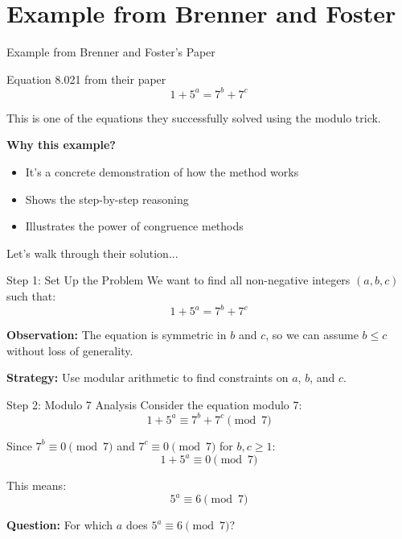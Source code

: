 \section{Example from Brenner and Foster}

\begin{frame}{Example from Brenner and Foster's Paper}
    \begin{block}{Equation 8.021 from their paper}
        \[1 + 5^a = 7^b + 7^c\]
    \end{block}

    \vspace{0.3cm}
    This is one of the equations they successfully solved using the modulo trick.

    \textbf{Why this example?}
    \begin{itemize}
        \item It's a concrete demonstration of how the method works
        \item Shows the step-by-step reasoning
        \item Illustrates the power of congruence methods
    \end{itemize}

    \vspace{0.2cm}
    Let's walk through their solution...
\end{frame}

\begin{frame}{Step 1: Set Up the Problem}
    We want to find all non-negative integers $(a,b,c)$ such that:
    \[1 + 5^a = 7^b + 7^c\]

    \vspace{0.3cm}
    \textbf{Observation:} The equation is symmetric in $b$ and $c$, so we can assume $b \leq c$ without loss of generality.

    \textbf{Strategy:} Use modular arithmetic to find constraints on $a$, $b$, and $c$.
\end{frame}

\begin{frame}{Step 2: Modulo 7 Analysis}
    Consider the equation modulo 7:
    \[1 + 5^a \equiv 7^b + 7^c \pmod 7\]

    Since $7^b \equiv 0 \pmod 7$ and $7^c \equiv 0 \pmod 7$ for $b,c \geq 1$:
    \[1 + 5^a \equiv 0 \pmod 7\]

    This means:
    \[5^a \equiv 6 \pmod 7\]

    \textbf{Question:} For which $a$ does $5^a \equiv 6 \pmod 7$?
\end{frame}

